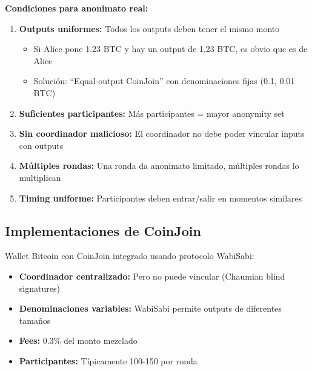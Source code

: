 \documentclass[11pt,a4paper,twoside]{book}
\begin{document}
\begin{keyidea}
\textbf{Condiciones para anonimato real:}

\begin{enumerate}
    \item \textbf{Outputs uniformes:} Todos los outputs deben tener el mismo monto
    \begin{itemize}
        \item Si Alice pone 1.23 BTC y hay un output de 1.23 BTC, es obvio que es de Alice
        \item Soluci\'on: ``Equal-output CoinJoin'' con denominaciones fijas (0.1, 0.01 BTC)
    \end{itemize}
    
    \item \textbf{Suficientes participantes:} M\'as participantes = mayor anonymity set
    
    \item \textbf{Sin coordinador malicioso:} El coordinador no debe poder vincular inputs con outputs
    
    \item \textbf{M\'ultiples rondas:} Una ronda da anonimato limitado, m\'ultiples rondas lo multiplican
    
    \item \textbf{Timing uniforme:} Participantes deben entrar/salir en momentos similares
\end{enumerate}
\end{keyidea}

\subsection{Implementaciones de CoinJoin}

\begin{definition}
Wallet Bitcoin con CoinJoin integrado usando protocolo WabiSabi:
\begin{itemize}
    \item \textbf{Coordinador centralizado:} Pero no puede vincular (Chaumian blind signatures)
    \item \textbf{Denominaciones variables:} WabiSabi permite outputs de diferentes tama\~nos
    \item \textbf{Fees:} 0.3\% del monto mezclado
    \item \textbf{Participantes:} T\'ipicamente 100-150 por ronda
\end{itemize}
\end{definition}
\end{document}
